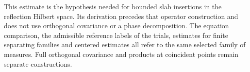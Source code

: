 This estimate is the hypothesis needed for bounded slab insertions in the
reflection Hilbert space. Its derivation precedes that operator
construction and does not use orthogonal covariance or a phase
decomposition. The equation comparison, the admissible reference labels of the trials,
estimates for finite separating families and centered estimates all refer to the same selected
family of measures. Full orthogonal covariance and products at coincident points
remain separate constructions.






